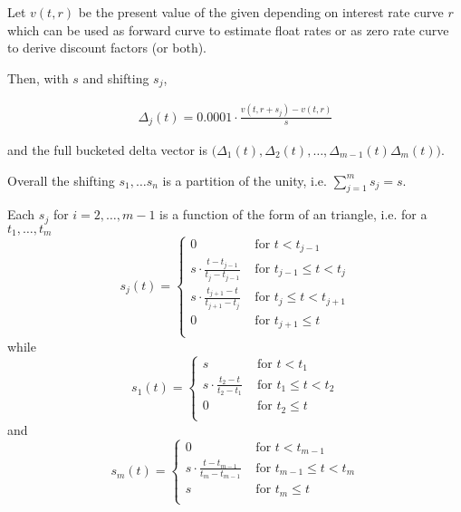 \documentclass[a4paper,10pt,english]{sphinxmanual}
\begin{document}
\begin{fulllineitems}
\sphinxAtStartPar
Let \(v(t, r)\) be the present value of the given 
depending on interest rate curve \(r\)
which can be used as forward curve to estimate float rates
or as zero rate curve to derive discount factors (or both).

\sphinxAtStartPar
Then, with  \(s\) and shifting \(s_j\),

\sphinxAtStartPar
\begin{equation*}
\begin{split}\Delta_j(t) = 0.0001 \cdot \frac{v(t, r + s_j) - v(t, r)}{s}\end{split}
\end{equation*}

\sphinxAtStartPar
and the full bucketed delta vector is
\(\big(\Delta_1(t), \Delta_2(t), \dots, \Delta_{m-1}(t) \Delta_m(t)\big)\).

\sphinxAtStartPar
Overall the shifting \(s_1, \dots s_n\) is a partition of the unity,
i.e. \(\sum_{j=1}^m s_j = s\).

\sphinxAtStartPar
Each \(s_j\) for \(i=2, \dots, m-1\) is a function of the form of an triangle,
i.e. for a  \(t_1, \dots, t_m\)
\[
s_j(t) =
\left\{
\begin{array}{cl}
    0 & \text{ for } t < t_{j-1} \\
    s \cdot \frac{t-t_{j-1}}{t_j-t_{j-1}}
        & \text{ for } t_{j-1} \leq t < t_j \\
    s \cdot \frac{t_{j+1}-t}{t_{j+1}-t_j}
        & \text{ for } t_j \leq t < t_{j+1} \\
    0 & \text{ for } t_{j+1} \leq t \\
\end{array}
\right.
\]
\sphinxAtStartPar
while
\[
s_1(t) =
\left\{
\begin{array}{cl}
    s & \text{ for } t < t_1 \\
    s \cdot \frac{t_2-t}{t_2-t_1} & \text{ for } t_1 \leq t < t_2 \\
    0 & \text{ for } t_2 \leq t \\
\end{array}
\right.
\]
\sphinxAtStartPar
and
\[
s_m(t) =
\left\{
\begin{array}{cl}
    0 & \text{ for } t < t_{m-1} \\
    s \cdot \frac{t-t_{m-1}}{t_m-t_{m-1}}
        & \text{ for } t_{m-1} \leq t < t_m \\
    s & \text{ for } t_m \leq t \\
\end{array}
\right.
\]
\end{fulllineitems}
\end{document}
